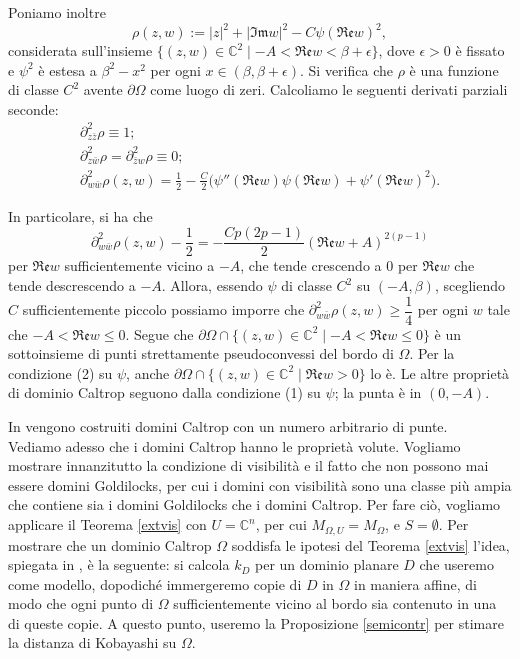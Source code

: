 Poniamo inoltre
$$\rho(z,w):=|z|^2+|\mathfrak{Im}w|^2-C\psi(\mathfrak{Re}w)^2,$$
considerata sull'insieme $\{(z,w)\in\mathbb{C}^2\mid -A<\mathfrak{Re}w<\beta+\epsilon\}$, dove $\epsilon>0$ è fissato e $\psi^2$ è estesa a $\beta^2-x^2$ per ogni $x\in(\beta,\beta+\epsilon)$. Si verifica che $\rho$ è una funzione di classe $C^2$ avente $\partial\Omega$ come luogo di zeri. Calcoliamo le seguenti derivati parziali seconde:
\begin{gather*}
    \partial^2_{z\bar{z}}\rho\equiv 1;\\
    \partial^2_{z\bar{w}}\rho=\partial^2_{\bar{z}w}\rho\equiv 0;\\
    \partial^2_{w\bar{w}}\rho(z,w)=\frac{1}{2}-\frac{C}{2}\big(\psi''(\mathfrak{Re}w)\psi(\mathfrak{Re}w)+\psi'(\mathfrak{Re}w)^2\big).
\end{gather*}

In particolare, si ha che
$$\partial^2_{w\bar{w}}\rho(z,w)-\frac{1}{2}=-\frac{Cp(2p-1)}{2}(\mathfrak{Re}w+A)^{2(p-1)}$$
per $\mathfrak{Re}w$ sufficientemente vicino a $-A$, che tende crescendo a $0$ per $\mathfrak{Re}w$ che tende descrescendo a $-A$. Allora, essendo $\psi$ di classe $C^2$ su $(-A,\beta)$, scegliendo $C$ sufficientemente piccolo possiamo imporre che $\partial^2_{w\bar{w}}\rho(z,w)\ge\dfrac{1}{4}$ per ogni $w$ tale che $-A<\mathfrak{Re}w\le 0$. Segue che $\partial\Omega\cap\{(z,w)\in\mathbb{C}^2\mid -A<\mathfrak{Re}w\le 0\}$ è un sottoinsieme di punti strettamente pseudoconvessi del bordo di $\Omega$. Per la condizione (2) su $\psi$, anche $\partial\Omega\cap\{(z,w)\in\mathbb{C}^2\mid \mathfrak{Re}w>0\}$ lo è. Le altre proprietà di dominio Caltrop seguono dalla condizione (1) su $\psi$; la punta è in $(0,-A)$.

In \cite[Section 3.2]{BM} vengono costruiti domini Caltrop con un numero arbitrario di punte. \\

Vediamo adesso che i domini Caltrop hanno le proprietà volute. Vogliamo mostrare innanzitutto la condizione di visibilità e il fatto che non possono mai essere domini Goldilocks, per cui i domini con visibilità sono una classe più ampia che contiene sia i domini Goldilocks che i domini Caltrop. Per fare ciò, vogliamo applicare il Teorema \ref{extvis} con $U=\mathbb{C}^n$, per cui $M_{\Omega,U}=M_\Omega$, e $S=\emptyset$. Per mostrare che un dominio Caltrop $\Omega$ soddisfa le ipotesi del Teorema \ref{extvis} l'idea, spiegata in \cite[Section 6]{BM}, è la seguente: si calcola $k_D$ per un dominio planare $D$ che useremo come modello, dopodiché immergeremo copie di $D$ in $\Omega$ in maniera affine, di modo che ogni punto di $\Omega$ sufficientemente vicino al bordo sia contenuto in una di queste copie. A questo punto, useremo la Proposizione \ref{semicontr} per stimare la distanza di Kobayashi su $\Omega$. 

